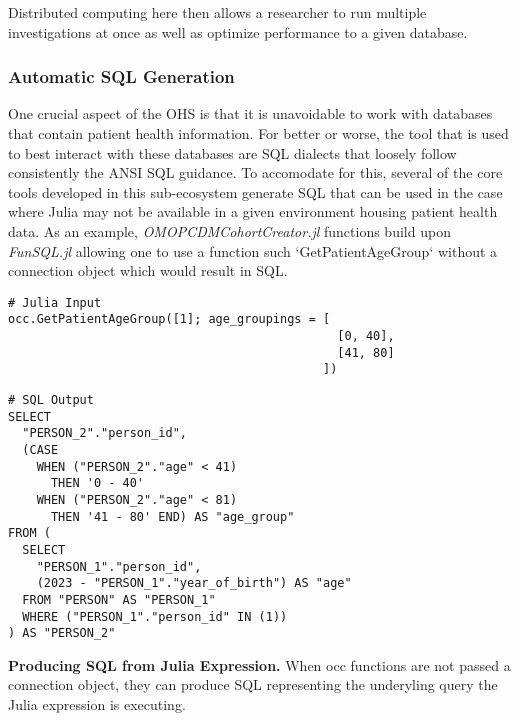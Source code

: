 \documentclass{juliacon}
\begin{document}
Distributed computing here then allows a researcher to run multiple investigations at once as well as optimize performance to a given database.

\subsubsection{Automatic SQL Generation}

One crucial aspect of the OHS is that it is unavoidable to work with databases that contain patient health information.
For better or worse, the tool that is used to best interact with these databases are SQL dialects that loosely follow consistently the ANSI SQL guidance.\cite{kelechavaSQLStandardISO2018}
To accomodate for this, several of the core tools developed in this sub-ecosystem generate SQL that can be used in the case where Julia may not be available in a given environment housing patient health data.
As an example, \textit{OMOPCDMCohortCreator.jl} functions build upon \textit{FunSQL.jl} allowing one to use a function such `GetPatientAgeGroup` without a connection object which would result in SQL.

\begin{listing}[!ht]
\begin{verbatim}
# Julia Input
occ.GetPatientAgeGroup([1]; age_groupings = [
                                              [0, 40], 
                                              [41, 80]
                                            ])

\end{verbatim}

\begin{verbatim}
# SQL Output
SELECT
  "PERSON_2"."person_id",
  (CASE 
    WHEN ("PERSON_2"."age" < 41) 
      THEN '0 - 40' 
    WHEN ("PERSON_2"."age" < 81) 
      THEN '41 - 80' END) AS "age_group"
FROM (
  SELECT
    "PERSON_1"."person_id",
    (2023 - "PERSON_1"."year_of_birth") AS "age"
  FROM "PERSON" AS "PERSON_1"
  WHERE ("PERSON_1"."person_id" IN (1))
) AS "PERSON_2"
\end{verbatim}
\caption{\textbf{Producing SQL from Julia Expression.} When occ functions are not passed a connection object, they can produce SQL representing the underyling query the Julia expression is executing.}
\label{listing:julia_sql}
\end{listing}
\end{document}
